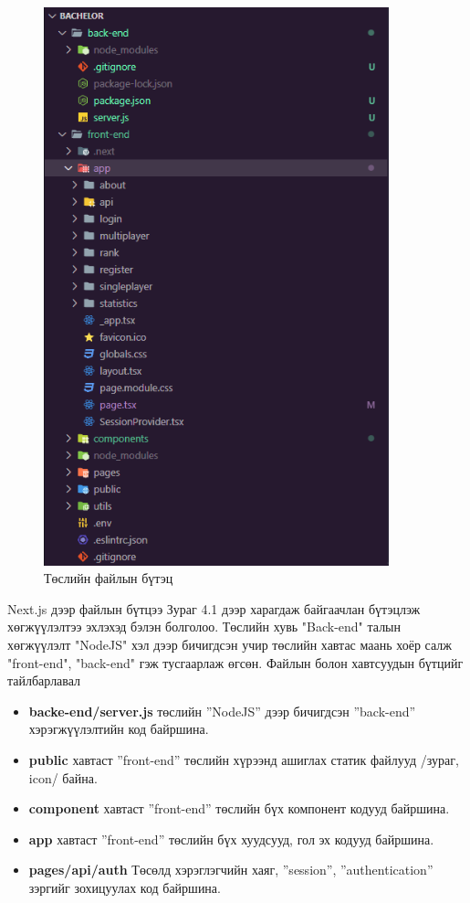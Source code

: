 \clearpage
\begin{figure}[h]
	\centering
	\includegraphics[width=10cm]{images/implement/file-structure.png}
	\caption{Төслийн файлын бүтэц}
	\label{fig:file-structure}
\end{figure}

Next.js дээр файлын бүтцээ Зураг 4.1 дээр харагдаж байгаачлан бүтэцлэж хөгжүүлэлтээ эхлэхэд бэлэн болголоо. Төслийн хувь "Back-end" талын хөгжүүлэлт "NodeJS" хэл дээр бичигдсэн учир төслийн хавтас маань хоёр салж "front-end", "back-end" гэж тусгаарлаж өгсөн. Файлын болон хавтсуудын бүтцийг тайлбарлавал

\begin{itemize}
	\item \textbf{backe-end/server.js} төслийн ”NodeJS” дээр бичигдсэн ”back-end” хэрэгжүүлэлтийн код байршина.
	\item \textbf{public} хавтаст ”front-end” төслийн хүрээнд ашиглах статик файлууд /зураг, icon/ байна.
	\item \textbf{component} хавтаст ”front-end” төслийн бүх компонент кодууд байршина.
	\item \textbf{app} хавтаст ”front-end” төслийн бүх хуудсууд, гол эх кодууд байршина.
	\item \textbf{pages/api/auth} Төсөлд хэрэглэгчийн хаяг, ”session”, ”authentication” зэргийг зохицуулах код байршина.
\end{itemize}


